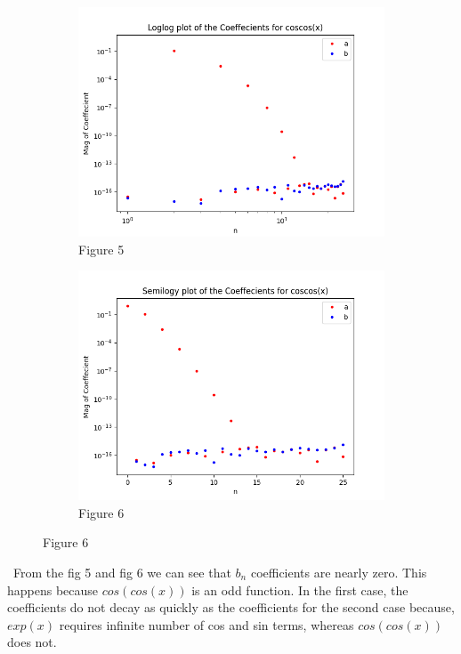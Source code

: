 \documentclass[12pt, a4paper]{report}
\begin{document}
\begin{figure}[h!]

\begin{subfigure}{0.55\textwidth}
    \centering
    \includegraphics[scale=0.9,width=\linewidth]{fig5.png} 
    \caption{Figure 5}
    \label{fig:my_label}
\end{subfigure}
\begin{subfigure}{0.55\textwidth}
    \centering
    \includegraphics[scale=0.9,width=\linewidth]{fig6.png} 
    \caption{Figure 6}
    \label{fig:image2}
\end{subfigure}
\end{figure}

\
From the fig 5 and fig 6 we can see that $b_n$ coefficients are nearly zero. This happens because $cos(cos(x))$ is an odd function. In the first case, the coefficients do not decay as quickly as the coefficients for the second case because, $exp(x)$ requires infinite number of cos and sin terms, whereas $cos(cos(x))$ does not.
 
\end{document}
